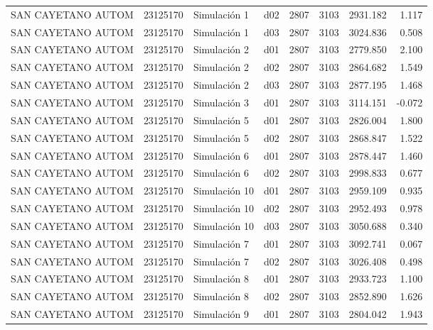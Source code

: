 \begin{landscape}
\begin{longtable}{lrlp{2cm}p{2cm}p{3cm}p{2cm}r}
      SAN CAYETANO AUTOM &  23125170 &   Simulación 1 &   d02 &      2807 &     3103 &  2931.182 &     1.117 \\
      SAN CAYETANO AUTOM &  23125170 &   Simulación 1 &   d03 &      2807 &     3103 &  3024.836 &     0.508 \\
      SAN CAYETANO AUTOM &  23125170 &   Simulación 2 &   d01 &      2807 &     3103 &  2779.850 &     2.100 \\
      SAN CAYETANO AUTOM &  23125170 &   Simulación 2 &   d02 &      2807 &     3103 &  2864.682 &     1.549 \\
      SAN CAYETANO AUTOM &  23125170 &   Simulación 2 &   d03 &      2807 &     3103 &  2877.195 &     1.468 \\
      SAN CAYETANO AUTOM &  23125170 &   Simulación 3 &   d01 &      2807 &     3103 &  3114.151 &    -0.072 \\
      SAN CAYETANO AUTOM &  23125170 &   Simulación 5 &   d01 &      2807 &     3103 &  2826.004 &     1.800 \\
      SAN CAYETANO AUTOM &  23125170 &   Simulación 5 &   d02 &      2807 &     3103 &  2868.847 &     1.522 \\
      SAN CAYETANO AUTOM &  23125170 &   Simulación 6 &   d01 &      2807 &     3103 &  2878.447 &     1.460 \\
      SAN CAYETANO AUTOM &  23125170 &   Simulación 6 &   d02 &      2807 &     3103 &  2998.833 &     0.677 \\
      SAN CAYETANO AUTOM &  23125170 &  Simulación 10 &   d01 &      2807 &     3103 &  2959.109 &     0.935 \\
      SAN CAYETANO AUTOM &  23125170 &  Simulación 10 &   d02 &      2807 &     3103 &  2952.493 &     0.978 \\
      SAN CAYETANO AUTOM &  23125170 &  Simulación 10 &   d03 &      2807 &     3103 &  3050.688 &     0.340 \\
      SAN CAYETANO AUTOM &  23125170 &   Simulación 7 &   d01 &      2807 &     3103 &  3092.741 &     0.067 \\
      SAN CAYETANO AUTOM &  23125170 &   Simulación 7 &   d02 &      2807 &     3103 &  3026.408 &     0.498 \\
      SAN CAYETANO AUTOM &  23125170 &   Simulación 8 &   d01 &      2807 &     3103 &  2933.723 &     1.100 \\
      SAN CAYETANO AUTOM &  23125170 &   Simulación 8 &   d02 &      2807 &     3103 &  2852.890 &     1.626 \\
      SAN CAYETANO AUTOM &  23125170 &   Simulación 9 &   d01 &      2807 &     3103 &  2804.042 &     1.943 \\

\end{longtable}
\end{landscape}
